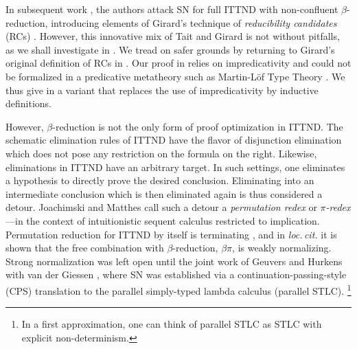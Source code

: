 \documentclass[a4paper,USenglish,cleveref, autoref, thm-restate]{lipics-v2019}
\newcommand{\loccit}{\emph{loc.\,cit.}\xspace}
\begin{document}
In subsequent work \cite{geuversHurkens:types17}, the authors attack
SN for full ITTND with non-confluent $\beta$-reduction, introducing
elements of Girard's technique of \emph{reducibility candidates} (RCs)
\cite{girard:thesis,girardLafontTaylor:proofsAndTypes}.  However, this
innovative mix of Tait and Girard is not without pitfalls, as we shall
investigate in .  We tread on safer grounds by
returning to Girard's original definition of RCs in .
Our proof in  relies on impredicativity
and could not be formalized in a predicative metatheory such as
Martin-Löf Type Theory \cite{MartinLoef84}.  We thus give in
 a variant that
replaces the use of impredicativity by inductive definitions.

However, $\beta$-reduction is not the only form of proof optimization in ITTND.
The schematic elimination rules of ITTND have the flavor of
disjunction elimination which does not pose any
restriction on the formula on the right.  Likewise, eliminations in
ITTND have an arbitrary target.  In such settings, one eliminates a hypothesis to directly prove the desired conclusion.
Eliminating into an intermediate conclusion which is then eliminated
again is thus considered a detour.
Joachimski and Matthes \cite{joachimskiMatthes:rta00}
call such a detour a \emph{permutation redex} or
\emph{$\pi$-redex}\footnotemark{}
---in the context of intuitionistic sequent calculus restricted to implication.
%
Permutation reduction for ITTND by itself is terminating
\cite{geuversHurkens:types17}, and in \loccit it is shown that the
free combination with $\beta$-reduction, $\beta\pi$, is weakly
normalizing.  Strong normalization was left open until the joint work
of Geuvers and Hurkens
with van der Giessen \cite{geuversGiessenHurkens:fundinf19}, where SN
was established via a continuation-passing-style (CPS) translation to
the parallel simply-typed lambda calculus (parallel STLC).%
\footnote{In a first approximation, one can think of parallel STLC as STLC with explicit non-determinism.}
\end{document}
